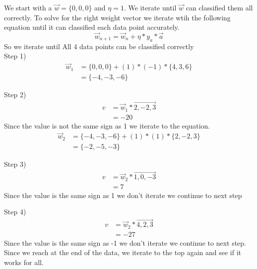\documentclass[12pt,english]{article}
\begin{document}
We start with a $\vec{w} = \{ 0,0,0\}$ and $\eta = 1$. We iterate until $\vec{w}$ can classified them all correctly. To solve for the  right weight vector we iterate wtih the following equation until it can classified each data point accurately.
\begin{equation*}
\vec{w}_{n+1} = \vec{w}_n + \eta * y_a * \vec{a}
\end{equation*}
So we iterate until All 4 data points can be classified correctly\\
Step 1)
\begin{equation}\tag{1}
\begin{split}
\vec{w}_{1} &= \{0,0,0\}+ (1) * (-1) * \{4,3,6 \}\\
&= \{-4,-3,-6 \}
\end{split}
\end{equation}

Step 2)
\begin{equation*}
\begin{split}
v&= \vec{w}_1* \overrightarrow{2,-2,3}\\
&= -20
\end{split}
\end{equation*}
Since the value is not the same sign as 1 we iterate to the equation.
\begin{equation}\tag{2}
\begin{split}
\vec{w}_{2} &= \{-4,-3,-6\}+ (1) * (1) * \{2,-2,3 \}\\
&= \{-2,-5,-3 \}
\end{split}
\end{equation}

Step 3)
\begin{equation*}
\begin{split}
v&= \vec{w}_2 * \overrightarrow{1,0,-3}\\
&= 7
\end{split}
\end{equation*}
Since the value is the same sign as 1 we don't iterate we continue to next step\par

Step 4)
\begin{equation*}
\begin{split}
v&= \vec{w}_2 * \overrightarrow{4,2,3}\\
&= -27
\end{split}
\end{equation*}
Since the value is the same sign as -1 we don't iterate we continue to next step. Since we reach at the end of the data, we iterate to the top again and see if it works for all.\\
\end{document}
